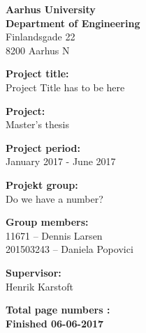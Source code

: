 \vspace*{1cm}

\begin{minipage}[t]{1\textwidth}

{\small 
\flushleft
\textbf{Aarhus University}\\
\textbf{Department of Engineering}  \\
Finlandsgade 22 \\
8200 Aarhus N \\
}

\vspace*{1cm}

\textbf{Project title:} \\[5pt]\bigskip\hspace{2ex}
Project Title has to be here

\textbf{Project:} \\[5pt]\bigskip\hspace{2ex}
Master's thesis

\textbf{Project period:} \\[5pt]\bigskip\hspace{2ex}
January 2017 - June 2017

\textbf{Projekt group:} \\[5pt]\bigskip\hspace{2ex}
Do we have a number?

\textbf{Group members:} \\[5pt]\hspace*{2ex}
11671 	  -- Dennis Larsen \\\hspace*{2ex}
201503243 -- Daniela Popovici \\\hspace*{2ex}



\textbf{Supervisor:} \\[5pt]\hspace*{2ex}
Henrik Karstoft \\\bigskip\hspace{2ex}

\vspace*{1cm}

\textbf{Total page numbers : \pageref{LastPage}} \\
\textbf{Finished 06-06-2017}


\end{minipage}
\hfill
\vfill

